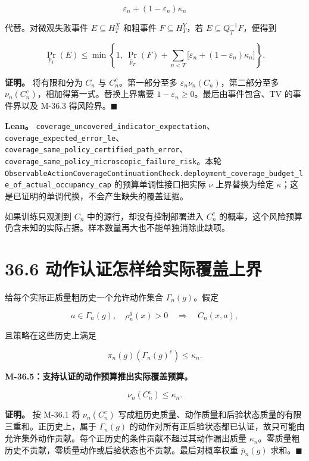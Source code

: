 \documentclass[
  11pt,
  oneside]{book}
\begin{document}
\[\varepsilon_n+(1-\varepsilon_n)\kappa_n\]

代替。对微观失败事件 \(E\subseteq H_T^X\) 和粗事件 \(F\subseteq H_T^Y\)，若 \(E\subseteq Q_T^{-1}F\)，便得到

\[\Pr_{p_T}(E)\le
\min\left\{1,\ \Pr_{\widehat p_T}(F)
+\sum_{n<T}\bigl[\varepsilon_n+(1-\varepsilon_n)\kappa_n\bigr]\right\}.\]

\textbf{证明。} 将有限和分为 \(C_n\) 与 \(C_n^c\)。第一部分至多 \(\varepsilon_n\nu_n(C_n)\)，第二部分至多 \(\nu_n(C_n^c)\)，相加得第一式。替换上界需要 \(1-\varepsilon_n\ge0\)。最后由事件包含、TV 的事件界以及 M-36.3 得风险界。\(\blacksquare\)

\textbf{Lean。} \nolinkurl{coverage_uncovered_indicator_expectation}、\nolinkurl{coverage_expected_error_le}、\nolinkurl{coverage_same_policy_certified_path_error}、\nolinkurl{coverage_same_policy_microscopic_failure_risk}。本轮 \nolinkurl{ObservableActionCoverageContinuationCheck.deployment_coverage_budget_le_of_actual_occupancy_cap} 的预算单调性接口把实际 \(\nu\) 上界替换为给定 \(\kappa\)；这是已证明的单调代换，不会产生缺失的覆盖证据。

如果训练只观测到 \(C_n\) 中的源行，却没有控制部署进入 \(C_n^c\) 的概率，这个风险预算仍含未知的实际占据。样本数量再大也不能单独消除此缺项。

\section{36.6 动作认证怎样给实际覆盖上界}\label{ux52a8ux4f5cux8ba4ux8bc1ux600eux6837ux7ed9ux5b9eux9645ux8986ux76d6ux4e0aux754c}

给每个实际正质量粗历史一个允许动作集合 \(\Gamma_n(g)\)。假定

\[a\in\Gamma_n(g),\quad \rho_n^g(x)>0
\quad\Longrightarrow\quad C_n(x,a),\]

且策略在这些历史上满足

\[\pi_n(g)(\Gamma_n(g)^c)\le\kappa_n.\]

\hypertarget{m-36-5}{}\label{m-36-5}

\textbf{M-36.5：支持认证的动作预算推出实际覆盖预算。}

\[\nu_n(C_n^c)\le\kappa_n.\]

\textbf{证明。} 按 M-36.1 将 \(\nu_n(C_n^c)\) 写成粗历史质量、动作质量和后验状态质量的有限三重和。正历史上，属于 \(\Gamma_n(g)\) 的动作对所有正后验状态都已认证，故只可能由允许集外动作贡献。每个正历史的条件贡献不超过其动作漏出质量 \(\kappa_n\)。零质量粗历史不贡献，零质量动作或后验状态也不贡献。最后对概率权重 \(\bar p_n(g)\) 求和。\(\blacksquare\)
\end{document}
